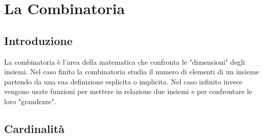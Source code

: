 \chapter{La Combinatoria}
\section{Introduzione}
La combinatoria è l'area della matematica che confronta le "dimensioni" degli insiemi.
Nel caso finito la combinatoria studia il numero di elementi di un insieme partendo da una sua definizione esplicita o
 implicita. Nel caso infinito invece vengono usate funzioni per mettere in relazione
 due insiemi e per confrontare le loro "grandezze".
\section{Cardinalità}
